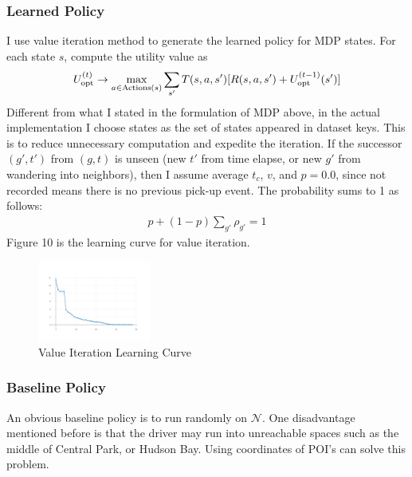\documentclass[letterpaper, 10 pt, conference]{ieeeconf}
\begin{document}
\subsubsection{Learned Policy}
I use value iteration method to generate the learned policy for MDP states. For each state $s$, compute the utility value as 
\begin{align}
U_{\text{opt}}^{(t)}\to \operatornamewithlimits{max}_{a\in \text{Actions}(s)}\sum_{s'}T(s,a,s')[R(s,a,s')+U_{\text{opt}}^{(t-1)}(s')]
\end{align}
Different from what I stated in the formulation of MDP above, in the actual implementation I choose states as the set of states appeared in dataset keys. This is to reduce unnecessary computation and expedite the iteration. If the successor $(g',t')$ from $(g,t)$ is unseen (new $t'$ from time elapse, or new $g'$ from wandering into neighbors), then I assume average $t_c$, $v$, and $p=0.0$, since not recorded means there is no previous pick-up event. The probability sums to 1 as follows:
\begin{align}
p + (1-p)\sum_{g'}\rho_{g'} =1
\end{align}
Figure 10 is the learning curve for value iteration.
\begin{figure}
\centering
\includegraphics[width=0.33\textwidth]{tiny_VI_curve.png}
\caption{Value Iteration Learning Curve}
\end{figure}
\subsubsection{Baseline Policy}
An obvious baseline policy is to run randomly on $\mathcal{N}$. One disadvantage mentioned before is that the driver may run into unreachable spaces such as the middle of Central Park, or Hudson Bay. Using coordinates of POI's can solve this problem.
\end{document}
